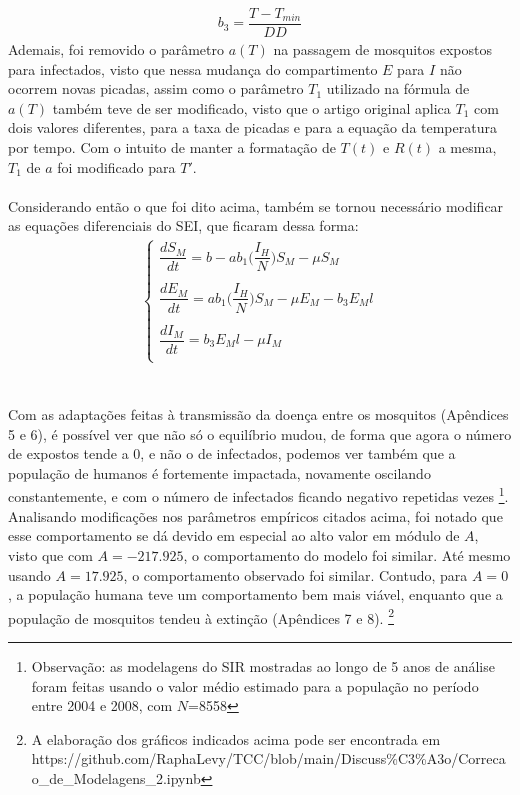 \begin{gather*}
    b_3 = \dfrac{T-T_{min}}{DD}
\end{gather*}
Ademais, foi removido o parâmetro $a(T)$ na passagem de mosquitos expostos para infectados, visto que nessa mudança do compartimento $E$ para $I$ não ocorrem novas picadas, assim como o parâmetro $T_1$ utilizado na fórmula de $a(T)$ também teve de ser modificado, visto que o artigo original aplica $T_1$ com dois valores diferentes, para a taxa de picadas e para a equação da temperatura por tempo. Com o intuito de manter a formatação de $T(t)$ e $R(t)$ a mesma, $T_1$ de $a$ foi modificado para $T'$.
\\\\
Considerando então o que foi dito acima, também se tornou necessário modificar as equações diferenciais do SEI, que ficaram dessa forma:
\begin{gather*}
\begin{cases}
\dfrac{dS_M}{dt} = b - ab_1\bigg(\dfrac{I_H}{N}\bigg)S_M - \mu S_M\\
\\
\dfrac{dE_M}{dt} = ab_1\bigg(\dfrac{I_H}{N}\bigg)S_M - \mu E_M - b_3E_Ml\\
\\
\dfrac{dI_M}{dt} = b_3E_Ml -\mu I_M\\
\end{cases}
\end{gather*}
\\\\
Com as adaptações feitas à transmissão da doença entre os mosquitos 
(Apêndices 5 e 6), é possível ver que não só o 
equilíbrio mudou, de forma que agora o número de 
expostos tende a 0, e não o de infectados, podemos ver também que a população 
de humanos é fortemente impactada, novamente oscilando constantemente, e com 
o número de infectados ficando negativo repetidas vezes \footnote{Observação: 
as modelagens do SIR mostradas ao longo de 5 anos de análise foram feitas 
usando o valor médio estimado para a população no período entre 2004 e 2008, 
com $N$=8558}.
Analisando modificações nos parâmetros empíricos citados acima, foi notado que esse comportamento se dá devido em especial ao alto valor em módulo de $A$, visto que com $A=-217.925$, o comportamento do modelo foi similar. Até mesmo usando $A=17.925$, o comportamento observado foi similar. Contudo, para $A=0$, a população humana teve um comportamento bem mais viável, enquanto que a população de mosquitos tendeu à extinção (Apêndices 7 e 8).
\footnote{A elaboração dos gráficos indicados acima pode ser encontrada em
\\
https://github.com/RaphaLevy/TCC/blob/main/Discuss\%C3\%A3o/Correcao\_de\_Modelagens\_2.ipynb}
